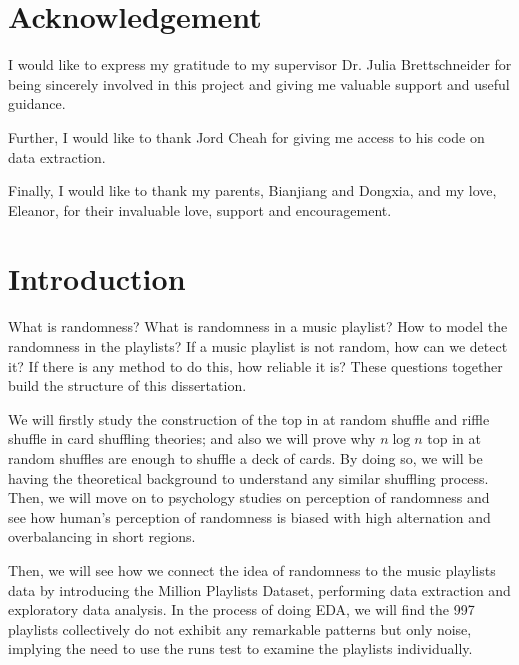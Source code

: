 \documentclass[12pt]{article}
\theoremstyle{plain}
\theoremstyle{definition}
\theoremstyle{remark}
\begin{document}
\hfill

\hfill

\hfill

\hfill

\section*{Acknowledgement}
I would like to express my gratitude to my supervisor Dr. Julia Brettschneider for being sincerely involved in this project and giving me valuable support and useful guidance. 

Further, I would like to thank Jord Cheah for giving me access to his code on data extraction.

Finally, I would like to thank my parents, Bianjiang and Dongxia, and my love, Eleanor, for their invaluable love, support and encouragement.

\clearpage

\tableofcontents

\clearpage


\section{Introduction}
What is randomness? What is randomness in a music playlist? How to model the randomness in the playlists? If a music playlist is not random, how can we detect it? If there is any method to do this, how reliable it is? These questions together build the structure of this dissertation.

We will firstly study the construction of the top in at random shuffle and riffle shuffle in card shuffling theories; and also we will prove why $n\log n$ top in at random shuffles are enough to shuffle a deck of cards. By doing so, we will be having the theoretical background to understand any similar shuffling process. Then, we will move on to psychology studies on perception of randomness and see how human's perception of randomness is biased with high alternation and overbalancing in short regions. 

Then, we will see how we connect the idea of randomness to the music playlists data by introducing the Million Playlists Dataset, performing data extraction and exploratory data analysis. In the process of doing EDA, we will find the 997 playlists collectively do not exhibit any remarkable patterns but only noise, implying the need to use the runs test to examine the playlists individually.
\end{document}
